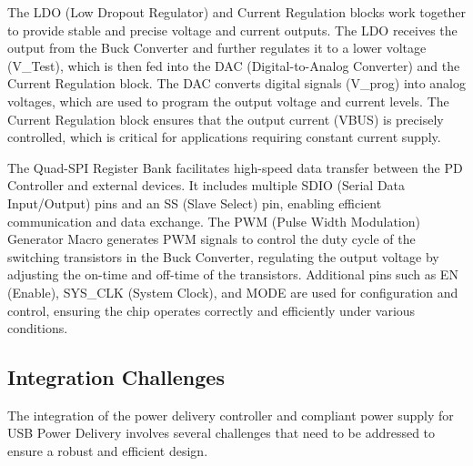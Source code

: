The LDO (Low Dropout Regulator) and Current Regulation blocks work together to provide stable and precise voltage and current outputs. The LDO receives the output from the Buck Converter and further regulates it to a lower voltage (V\_Test), which is then fed into the DAC (Digital-to-Analog Converter) and the Current Regulation block. The DAC converts digital signals (V\_prog) into analog voltages, which are used to program the output voltage and current levels. The Current Regulation block ensures that the output current (VBUS) is precisely controlled, which is critical for applications requiring constant current supply.

The Quad-SPI Register Bank facilitates high-speed data transfer between the PD Controller and external devices. It includes multiple SDIO (Serial Data Input/Output) pins and an SS (Slave Select) pin, enabling efficient communication and data exchange. The PWM (Pulse Width Modulation) Generator Macro generates PWM signals to control the duty cycle of the switching transistors in the Buck Converter, regulating the output voltage by adjusting the on-time and off-time of the transistors. Additional pins such as EN (Enable), SYS\_CLK (System Clock), and MODE are used for configuration and control, ensuring the chip operates correctly and efficiently under various conditions.

\subsection{Integration Challenges}

The integration of the power delivery controller and compliant power supply for USB Power Delivery involves several challenges that need to be addressed to ensure a robust and efficient design.

